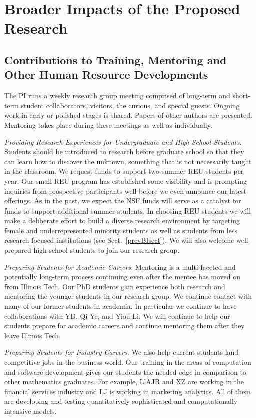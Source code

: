 \documentclass[11pt]{NSFamsart}
\begin{document}
\section{Broader Impacts of the Proposed Research}\label{SectBroad}


\subsection{Contributions to Training, Mentoring and Other Human Resource Developments}
The PI runs a weekly research group meeting comprised of long-term and short-term student 
collaborators, 
visitors, the curious, and special guests.  Ongoing work in early or polished stages is shared.  Papers 
of other authors are presented.  Mentoring takes place during these meetings as well as individually.

\emph{Providing Research Experiences for Undergraduate and High School Students.} Students 
should be introduced to research before graduate school so that they can learn how to 
discover the unknown, something that is not necessarily taught in the classroom. We request funds 
to 
support two summer REU students per year.  Our small REU program has established some visibility 
and is prompting inquiries from prospective participants well before we 
even announce our latest 
offerings. As in the past, we expect the NSF funds will serve as a catalyst for funds to 
support additional summer students. In choosing REU students we will make a deliberate effort to 
build 
a diverse research environment by targeting female and underrepresented minority students as well 
as students from less research-focused institutions (see Sect.~\ref{prevBIsect}). We will also 
welcome well-prepared high school students to join our research group.

\emph{Preparing Students for Academic Careers.} Mentoring is a multi-faceted and 
potentially long-term process continuing even after the mentee has moved on from Illinois Tech.  
Our PhD students gain experience both research and mentoring the younger students in our 
research group.  We 
continue contact with many of our former students in academia.  In particular we continue to have 
collaborations with YD, Qi Ye, and Yiou Li.  We will continue to help our students prepare for 
academic careers and continue mentoring them after they leave Illinois Tech.

\emph{Preparing Students for Industry Careers.}
We also help current students land 
competitive jobs in the business world. Our training in the areas of computation and software 
development gives our students the needed edge in comparison to other mathematics 
graduates. For example, LlAJR and XZ are working in the financial services industry and  LJ is 
working in marketing analytics.  All of them are developing and testing quantitatively sophisticated 
and computationally intensive models.
\end{document}
